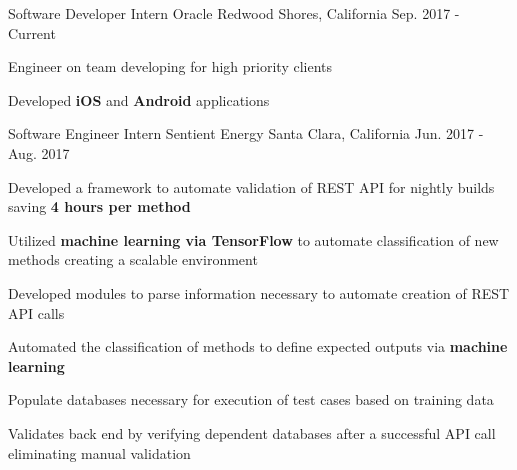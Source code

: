 


\begin{cventries}


\cventry
{Software Developer Intern} %
{Oracle} %
{Redwood Shores, California} %
{Sep. 2017 - Current} %
{
\begin{cvitems}
\item {Engineer on team developing for high priority clients}
\item {Developed \textbf{iOS} and \textbf{Android} applications}
\end{cvitems}
}

\cventry
{Software Engineer Intern} %
{Sentient Energy} %
{Santa Clara, California} %
{Jun. 2017 - Aug. 2017} %
{ %
\begin{cvitems}
\item {Developed a framework to automate validation of REST API for nightly builds saving \textbf{4 hours per method}}
\item {Utilized \textbf{machine learning via TensorFlow} to automate classification of new methods creating a scalable environment}
\item {Developed modules to parse information necessary to automate creation of REST API calls}
\item {Automated the classification of methods to define expected outputs via \textbf{machine learning}}
\item {Populate databases necessary for execution of test cases based on training data}
\item {Validates back end by verifying dependent databases after a successful API call eliminating manual validation}
\end{cvitems}
}



\end{cventries}

